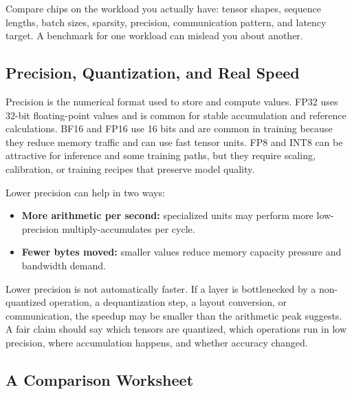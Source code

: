 \begin{aside}
Compare chips on the workload you actually have: tensor shapes, sequence lengths, batch sizes, sparsity, precision, communication pattern, and latency target. A benchmark for one workload can mislead you about another.
\end{aside}

\subsection{Precision, Quantization, and Real Speed}

Precision is the numerical format used to store and compute values. FP32 uses 32-bit floating-point values and is common for stable accumulation and reference calculations. BF16 and FP16 use 16 bits and are common in training because they reduce memory traffic and can use fast tensor units. FP8 and INT8 can be attractive for inference and some training paths, but they require scaling, calibration, or training recipes that preserve model quality.

Lower precision can help in two ways:

\begin{itemize}[leftmargin=*]
  \item \textbf{More arithmetic per second:} specialized units may perform more low-precision multiply-accumulates per cycle.
  \item \textbf{Fewer bytes moved:} smaller values reduce memory capacity pressure and bandwidth demand.
\end{itemize}

Lower precision is not automatically faster. If a layer is bottlenecked by a non-quantized operation, a dequantization step, a layout conversion, or communication, the speedup may be smaller than the arithmetic peak suggests. A fair claim should say which tensors are quantized, which operations run in low precision, where accumulation happens, and whether accuracy changed.

\subsection{A Comparison Worksheet}

